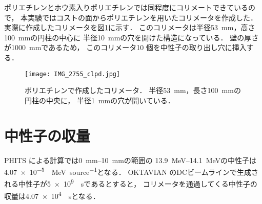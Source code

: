 \documentclass[../master]{subfiles}
\begin{document}
ポリエチレンとホウ素入りポリエチレンでは同程度にコリメートできているので，
本実験ではコストの面からポリエチレンを用いたコリメータを作成した．
実際に作成したコリメータを図\ref{pic::collimator}に示す．
このコリメータは半径\SI{53}{\milli\metre}，高さ\SI{100}{\milli\metre}の円柱の中心に
半径\SI{10}{\milli\metre}の穴を開けた構造になっている．
壁の厚さが\SI{1000}{\milli\metre}であるため，
このコリメータ10 個を中性子の取り出し穴に挿入する．
\begin{figure}
  \centering
  \texttt{[image: IMG\_2755\_clpd.jpg]}
  \caption[ポリエチレンで作成したコリメータ．]
          {ポリエチレンで作成したコリメータ．
            半径\SI{53}{\milli\metre}，長さ\SI{100}{\milli\metre}の円柱の中央に，
          半径\SI{1}{\milli\metre}の穴が開いている．}
  \label{pic::collimator}
\end{figure}

\section{中性子の収量}
PHITS による計算では\SIrange{0}{10}{\milli\metre}の範囲の
\SIrange{13.9}{14.1}{\mega\electronvolt}の中性子は
\SI{4.07e-5}{\per\mega\electronvolt\per source}となる．
OKTAVIAN のDCビームラインで生成される中性子が\SI{5e9}{\per\second}であるとすると，
コリメータを通過してくる中性子の収量は\SI{4.07e4}{\per\second}となる．
\end{document}
